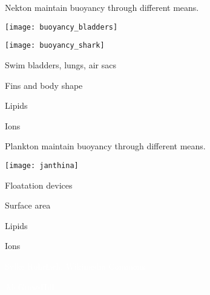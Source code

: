 \documentclass[t,handout]{beamer}  %
\begin{document}
\begin{frame}[t]{Nekton maintain buoyancy through different means.}
	\begin{multicols}{2}

		\texttt{[image: buoyancy\_bladders]}

		\vspace*{2\baselineskip}
		
		\texttt{[image: buoyancy\_shark]}

	\columnbreak
	
		\hangpara Swim bladders, lungs, air sacs
		
		\hangpara Fins and body shape
		
		\hangpara Lipids
		
		\hangpara Ions

	\end{multicols}

\end{frame}

\begin{frame}[t]{Plankton maintain buoyancy through different means.}
	\begin{multicols}{2}

		\texttt{[image: janthina]}

		

	\columnbreak
	
		\hangpara Floatation devices
		
		\hangpara Surface area
		
		\hangpara Lipids
		
		\hangpara Ions

	\end{multicols}

\end{frame}

{
\begin{frame}[b]
\hfill\tiny\textcolor{white}{Sylke Rohrlach, Wikimedia Commons}
\end{frame}
}

{
\begin{frame}[b]
\tiny\textcolor{white}{\textcopyright\,McGraw-Hill}
\end{frame}
}
\end{document}
